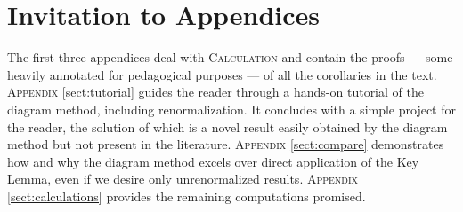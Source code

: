 \documentclass{article}
\theoremstyle{plain}
\theoremstyle{definition}
\begin{document}


    
    


\clearpage
\newpage
\renewcommand{\thesection}{\Alph{section}}
\setcounter{section}{0}

\section*{Invitation to Appendices}
    The first three appendices deal with \textsc{Calculation} and contain the
    proofs --- some heavily annotated for pedagogical purposes --- of all the
    corollaries in the text.
    \textsc{Appendix} \ref{sect:tutorial} guides the reader through a hands-on
        tutorial of the diagram method, including renormalization.  It
        concludes with a simple project for the reader, the solution of which
        is a novel result easily obtained by the diagram method but not present
        in the literature. 
    \textsc{Appendix} \ref{sect:compare} demonstrates how and why the diagram
        method excels over direct application of the Key Lemma, even if we
        desire only unrenormalized results.
    \textsc{Appendix} \ref{sect:calculations} provides the remaining
        computations promised.
\end{document}
